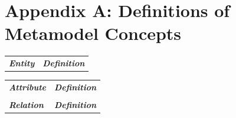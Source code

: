 \documentclass[runningheads,a4paper]{llncs}
\begin{document}



\clearpage
\section*{Appendix A: Definitions of Metamodel Concepts}
\begin{minipage}{1\linewidth}
\begin{minipage}{0.30\textwidth} 

\begin{table}[H]
\vspace{-1.0cm}
\fontsize{6}{6.5}\selectfont

\begin{tabular}{l p{4.6cm}}

\textbf{\textit{Entity}} & \textbf{\textit{Definition}}  \\

 \end{tabular}
\end{table}
\end{minipage}
 \hspace{4em plus 1fill} 
\begin{minipage}{0.46\textwidth} 
 \begin{table}[H]
\fontsize{6}{6.5}\selectfont
\vspace{-1.0cm}
\label{table-entities}
\begin{tabular}{|l p{4.1cm}}
 
\textbf{\textit{Attribute}} & \textbf{\textit{Definition}}  \\ 

 & \\
 \textbf{\textit{Relation}} & \textbf{\textit{Definition}}  \\ 


\end{tabular}
\end{table}

\end{minipage}
\end{minipage}
\end{document}
